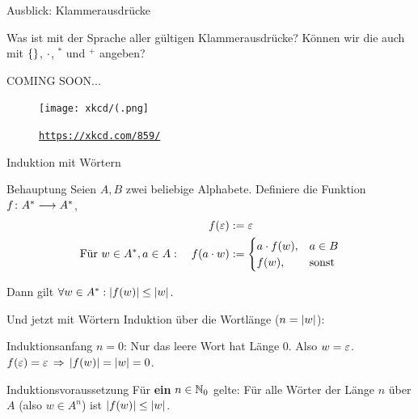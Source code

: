 



\begin{frame}{Ausblick: Klammerausdrücke}
	
	Was ist mit der Sprache aller gültigen Klammerausdrücke? Können wir die auch mit $\left\{\right\}$, $\cdot$, ${}^*$ und ${}^+$ angeben? \\[1em]
	\pause
	
	\begin{block}{}
		\Large
		\centering
		COMING SOON... \\[1em]
	\end{block}

	\begin{figure}[H]
		\centering
		\texttt{[image: xkcd/(.png]}
		\vspace{-7pt}
		\caption{ \texttt{\url{https://xkcd.com/859/}} }
	\end{figure}
\end{frame}

%

\appendix
\beginbackup

\begin{frame}{Induktion mit Wörtern}
	\begin{block}{Behauptung}
		Seien $A, B$ zwei beliebige Alphabete. Definiere die Funktion $f \colon A^* \longrightarrow A^*$,
		\begin{align*}
			f(\varepsilon) &:= \varepsilon \\
			\text{Für } w \in A^*, a \in A: \quad f(a \cdot w) &:= 
			\begin{cases}
				a \cdot f(w), &a \in B \\
				f(w), &\text{sonst}
			\end{cases}\\
		\end{align*}
	
	Dann gilt $\forall w \in A^*: \left\lvert f(w) \right\rvert \le \left\lvert w \right\rvert$.
	\end{block}
\end{frame}

\begin{frame}{Und jetzt mit Wörtern}
	Induktion über die Wortlänge ($n = \left\lvert w \right\rvert$):\\[0.5em]
	\pause
	\begin{block}{Induktionsanfang}
		$n = 0$: Nur das leere Wort hat Länge 0. Also $w = \varepsilon$.\\
		$f(\eps) = \eps \impl \size{f(w)} = \size w = 0$. \; \textbf{\checked}
	\end{block}
	\pause
	\begin{block}{Induktionsvoraussetzung}
		Für \textbf{ein} $n \in \mathbb{N}_0$ gelte: Für alle Wörter der Länge $n$ über $A$ (also $w \in A^n$) ist $\left\lvert f(w) \right\rvert \le \left\lvert w \right\rvert$.
	\end{block}
\end{frame}

